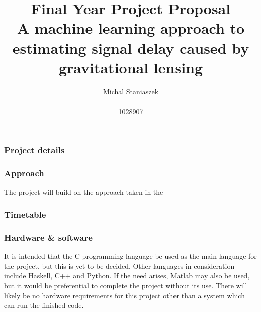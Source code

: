 \documentclass{article}
\title{Final Year Project Proposal\\ \vspace{0.2cm} \large{A machine learning approach to estimating signal delay caused by gravitational lensing}}
\author{Michal Staniaszek \\\\ 1028907}
\begin{document}
\maketitle

\subsubsection*{Project details}

 

\subsubsection*{Approach}

The project will build on the approach taken in the \cite{t09} \cite{t06}

\subsubsection*{Timetable}

\begin{gantt}{5}{9}
  \begin{ganttitle}
  \end{ganttitle}
  \begin{ganttitle}
  \end{ganttitle}
\end{gantt}

\subsubsection*{Hardware \& software}

It is intended that the C programming language be used as the main language for the project, but this is yet to be decided. Other languages in consideration include Haskell, C++ and Python. If the need arises, Matlab may also be used, but it would be preferential to complete the project without its use. There will likely be no hardware requirements for this project other than a system which can run the finished code.

\printbibliography
\end{document}
